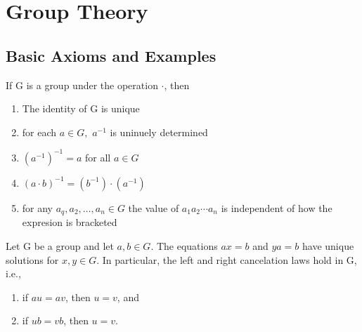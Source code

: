 \documentclass[../main]{subfiles}
\begin{document}
 
 \section{Group Theory}
 
 \subsection{Basic Axioms and Examples}
 
 \begin{prop}
  If G is a group under the operation $\cdot$, then
  \begin{enumerate}
   \item The identity of G is unique 
   \item for each $a \in G,$ $a^{-1}$ is uninuely determined
   \item $(a^{-1})^{-1} = a$ for all $a \in G$
   \item $(a\cdot b)^{-1}=(b^{-1})\cdot(a^{-1})$
   \item for any $a_q,a_2, \ldots,a_n\in G$ the value of $a_1 a_2 \cdots a_n$ is independent of how the expresion is bracketed 
  \end{enumerate}
 \end{prop}

 \begin{prop}
  Let G be a group and let $a,b\in G$. The equations $ax=b$ and $ya=b$ have unique solutions for $x,y \in G$. In particular, the left and right cancelation laws hold in G, i.e.,
  \begin{enumerate}
   \item if $au=av$, then $u=v$, and 
   \item if $ub=vb$, then $u=v$.
  \end{enumerate}

 \end{prop}

 
 
 
 
 
 
\end{document}
